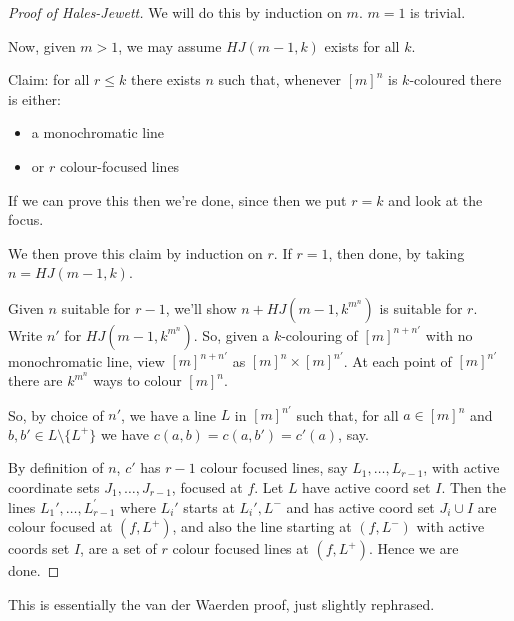 \documentclass[10pt,a4paper]{article}
\begin{document}
\begin{proof}[Proof of Hales-Jewett]
  We will do this by induction on $m$. $m=1$ is trivial.

  Now, given $m > 1$, we may assume $HJ(m-1, k)$ exists for all $k$.

  Claim: for all $r \leq k$ there exists $n$ such that, whenever $[m]^n$ is $k$-coloured there is either:
  \begin{itemize}
    \item a monochromatic line
    \item or $r$ colour-focused lines
  \end{itemize}
  If we can prove this then we're done, since then we put $r=k$ and look at the focus.

  We then prove this claim by induction on $r$. If $r=1$, then done, by taking $n = HJ(m-1,k)$.

  Given $n$ suitable for $r-1$, we'll show $n + HJ(m-1, k^{m^n})$ is suitable for $r$. Write $n'$ for $HJ(m-1, k^{m^n})$. So, given a $k$-colouring of $[m]^{n+n'}$ with no monochromatic line, view $[m]^{n+n'}$ as $[m]^n \times [m]^{n'}$. At each point of $[m]^{n'}$ there are $k^{m^n}$ ways to colour $[m]^n$.

  So, by choice of $n'$, we have a line $L$ in $[m]^{n'}$ such that, for all $a \in [m]^n$ and $b,b' \in L\setminus\{L^+\}$ we have $c(a,b) = c(a,b') = c'(a)$, say.

  By definition of $n$, $c'$ has $r-1$ colour focused lines, say $L_1, \ldots, L_{r-1}$, with active coordinate sets $J_1, \ldots, J_{r-1}$, focused at $f$. Let $L$ have active coord set $I$. Then the lines $L_1', \ldots, L_{r-1}^'$ where $L_i'$ starts at $L_i', L^-$ and has active coord set $J_i \cup I$ are colour focused at $(f, L^+)$, and also the line starting at $(f, L^-)$ with active coords set $I$, are a set of $r$ colour focused lines at $(f, L^+)$. Hence we are done.
\end{proof}
This is essentially the van der Waerden proof, just slightly rephrased.
\end{document}
